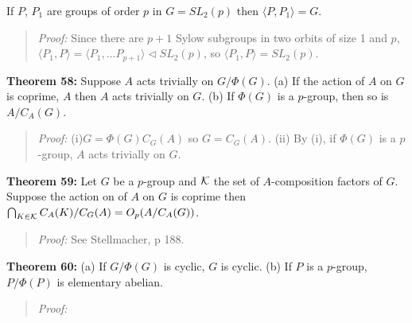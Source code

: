 If $P$, $P_1$ are groups of order $p$ in $G = SL_2(p)$ then $\langle P, P_1 \rangle = G$.
\begin{quote}
\emph{Proof:}
Since there are $p + 1$ Sylow subgroups in two orbits of size 1 and $p$, $\langle P_1, P \rangle =
\langle P_1, \ldots P_{p+1} \rangle \lhd SL_2(p)$, so $\langle P_1, P \rangle = SL_2(p)$.
\end{quote}
{\bf Theorem 58:}
Suppose $A$ acts trivially on $G/\Phi(G)$.  (a) If the action of $A$ on $G$ is coprime, $A$
then $A$ acts trivially on $G$. (b) If $\Phi(G)$ is a $p$-group, then so is $A/C_A(G)$.
\begin{quote}
\emph{Proof:} 
(i)$G= \Phi(G)C_G(A)$ so  $G= C_G(A)$.
(ii) By (i), if $\Phi(G)$ is a $p$-group, $A$ acts trivially on $G$.
\end{quote}
{\bf Theorem 59:}
Let $G$ be a $p$-group and ${\cal K}$ the set of $A$-composition factors of $G$.  Suppose the action on
of $A$ on $G$ is coprime then $\bigcap_{K \in {\cal K}} C_A(K)/C_G(A) = O_p(A/C_A(G))$.
\begin{quote}
\emph{Proof:}  See Stellmacher, p 188.
\end{quote}
{\bf Theorem 60:}  (a) If $G/\Phi(G)$ is cyclic, $G$ is cyclic.
(b) If $P$ is a $p$-group, $P/\Phi(P)$ is elementary abelian.
\begin{quote}
\emph{Proof:} 
\end{quote}
